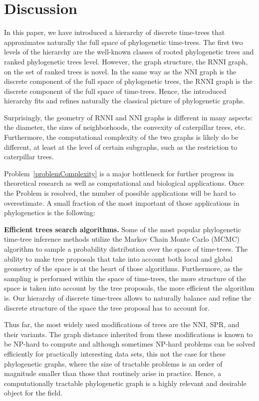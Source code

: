 \documentclass[11pt]{amsart}
\theoremstyle{definition}
\newcommand{\nni}{\mathrm{NNI}}
\newcommand{\rnni}{\mathrm{RNNI}}
\begin{document}
\section{Discussion}

In this paper, we have introduced a hierarchy of discrete time-trees that approximates naturally the full space of phylogenetic time-trees.
The first two levels of the hierarchy are the well-known classes of rooted phylogenetic trees and ranked phylogenetic trees level.
However, the graph structure, the $\rnni$ graph, on the set of ranked trees is novel.
In the same way as the $\nni$ graph is the discrete component of the full space of phylogenetic trees, the $\rnni$ graph is the discrete component of the full space of time-trees.
Hence, the introduced hierarchy fits and refines naturally the classical picture of phylogenetic graphs.

Surprisingly, the geometry of $\rnni$ and $\nni$ graphs is different in many aspects: the diameter, the sizes of neighborhoods, the convexity of caterpillar trees, etc.
Furthermore, the computational complexity of the two graphs is likely do be different, at least at the level of certain subgraphs, such as the restriction to caterpillar trees.

Problem~\ref{problemComplexity} is a major bottleneck for further progress in theoretical research as well as computational and biological applications.
Once the Problem is resolved, the number of possible applications will be hard to overestimate.
A small fraction of the most important of those applications in phylogenetics is the following:

\textbf{Efficient trees search algorithms.} Some of the most popular phylogenetic time-tree inference methods utilize the Markov Chain Monte Carlo (MCMC) algorithm to sample a probability distribution over the space of time-trees.
The ability to make tree proposals that take into account both local and global geometry of the space is at the heart of those algorithms.
Furthermore, as the sampling is performed within the space of time-trees, the more structure of the space is taken into account by the tree proposals, the more efficient the algorithm is.
Our hierarchy of discrete time-trees allows to naturally balance and refine the discrete structure of the space the tree proposal has to account for.

Thus far, the most widely used modifications of trees are the $\nni$, SPR, and their variants.
The graph distance inherited from these modifications is known to be NP-hard to compute and although sometimes NP-hard problems can be solved efficiently for practically interesting data sets, this not the case for these phylogenetic graphs, where the size of tractable problems is an order of magnitude smaller than those that routinely arise in practice.
Hence, a computationally tractable phylogenetic graph is a highly relevant and desirable object for the field.
\end{document}
